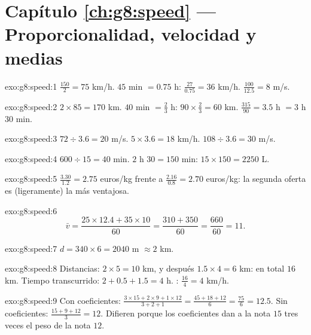 \section*{Capítulo \ref{ch:g8:speed} --- Proporcionalidad, velocidad y medias}

\begin{solution}{exo:g8:speed:1}
$\frac{150}{2} = 75$ km/h. \quad
$45$ min $= 0.75$ h: $\frac{27}{0.75} = 36$ km/h. \quad
$\frac{100}{12.5} = 8$ m/s.
\end{solution}

\begin{solution}{exo:g8:speed:2}
$2 \times 85 = 170$ km. \quad
$40$ min $= \frac23$ h: $90 \times \frac23 = 60$ km. \quad
$\frac{315}{90} = 3.5$ h $= 3$ h $30$ min.
\end{solution}

\begin{solution}{exo:g8:speed:3}
$72 \div 3.6 = 20$ m/s. \quad
$5 \times 3.6 = 18$ km/h. \quad
$108 \div 3.6 = 30$ m/s.
\end{solution}

\begin{solution}{exo:g8:speed:4}
$600 \div 15 = 40$ min. \quad
$2$ h $30 = 150$ min: $15 \times 150 = 2250$ L.
\end{solution}

\begin{solution}{exo:g8:speed:5}
$\frac{3.30}{1.2} = 2.75$ euros/kg frente a
$\frac{2.16}{0.8} = 2.70$ euros/kg: la segunda oferta es (ligeramente)
la más ventajosa.
\end{solution}

\begin{solution}{exo:g8:speed:6}
\[
\bar v = \frac{25 \times 12.4 + 35 \times 10}{60}
= \frac{310 + 350}{60} = \frac{660}{60} = 11 .
\]
\end{solution}

\begin{solution}{exo:g8:speed:7}
$d = 340 \times 6 = 2040$ m $\approx 2$ km.
\end{solution}

\begin{solution}{exo:g8:speed:8}
Distancias: $2 \times 5 = 10$ km, y después $1.5 \times 4 = 6$ km: en total
$16$ km. Tiempo transcurrido: $2 + 0.5 + 1.5 = 4$ h. :
$\frac{16}{4} = 4$ km/h.
\end{solution}

\begin{solution}{exo:g8:speed:9}
Con coeficientes:
$\frac{3 \times 15 + 2 \times 9 + 1 \times 12}{3 + 2 + 1}
= \frac{45 + 18 + 12}{6} = \frac{75}{6} = 12.5$.
Sin coeficientes: $\frac{15 + 9 + 12}{3} = 12$. Difieren porque los
coeficientes dan a la nota $15$ tres veces el peso de la nota
$12$.
\end{solution}

